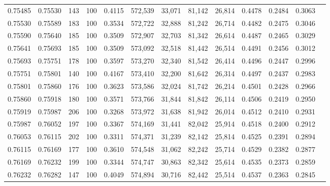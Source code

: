 \begin{tabular}{rrrrrrrrrrrrr}
0.75485 & 0.75530 &   143 & 100 &                                     0.4115 & 572,539 &  33,071 &  81,142 &  26,814 & 0.4478 & 0.2484 & 0.3063 \\
0.75530 & 0.75589 &   183 & 100 &                                     0.3534 & 572,722 &  32,888 &  81,242 &  26,714 & 0.4482 & 0.2475 & 0.3046 \\
0.75590 & 0.75640 &   185 & 100 &                                     0.3509 & 572,907 &  32,703 &  81,342 &  26,614 & 0.4487 & 0.2465 & 0.3029 \\
0.75641 & 0.75693 &   185 & 100 &                                     0.3509 & 573,092 &  32,518 &  81,442 &  26,514 & 0.4491 & 0.2456 & 0.3012 \\
0.75693 & 0.75751 &   178 & 100 &                                     0.3597 & 573,270 &  32,340 &  81,542 &  26,414 & 0.4496 & 0.2447 & 0.2996 \\
0.75751 & 0.75801 &   140 & 100 &                                     0.4167 & 573,410 &  32,200 &  81,642 &  26,314 & 0.4497 & 0.2437 & 0.2983 \\
0.75801 & 0.75860 &   176 & 100 &                                     0.3623 & 573,586 &  32,024 &  81,742 &  26,214 & 0.4501 & 0.2428 & 0.2966 \\
0.75860 & 0.75918 &   180 & 100 &                                     0.3571 & 573,766 &  31,844 &  81,842 &  26,114 & 0.4506 & 0.2419 & 0.2950 \\
0.75919 & 0.75987 &   206 & 100 &                                     0.3268 & 573,972 &  31,638 &  81,942 &  26,014 & 0.4512 & 0.2410 & 0.2931 \\
0.75987 & 0.76052 &   197 & 100 &                                     0.3367 & 574,169 &  31,441 &  82,042 &  25,914 & 0.4518 & 0.2400 & 0.2912 \\
0.76053 & 0.76115 &   202 & 100 &                                     0.3311 & 574,371 &  31,239 &  82,142 &  25,814 & 0.4525 & 0.2391 & 0.2894 \\
0.76115 & 0.76169 &   177 & 100 &                                     0.3610 & 574,548 &  31,062 &  82,242 &  25,714 & 0.4529 & 0.2382 & 0.2877 \\
0.76169 & 0.76232 &   199 & 100 &                                     0.3344 & 574,747 &  30,863 &  82,342 &  25,614 & 0.4535 & 0.2373 & 0.2859 \\
0.76232 & 0.76282 &   147 & 100 &                                     0.4049 & 574,894 &  30,716 &  82,442 &  25,514 & 0.4537 & 0.2363 & 0.2845 \\

\end{tabular}
